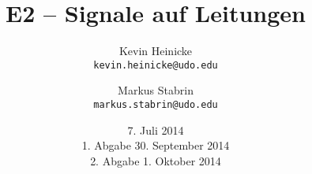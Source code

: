 

\usepackage[europeanresistors]{circuitikz}


\title{%
    E2 -- Signale auf Leitungen
}
\author{%
    Kevin Heinicke\\
    \texttt{kevin.heinicke@udo.edu}
    \and
    Markus Stabrin\\
    \texttt{markus.stabrin@udo.edu}
}
\date{%
    7. Juli 2014\\
    {\small 1. Abgabe} 30. September 2014\\
    {\small 2. Abgabe} 1. Oktober 2014
}

    \maketitle%
    \newpage
    \tableofcontents
    \newpage

    
    

    \printbibliography

